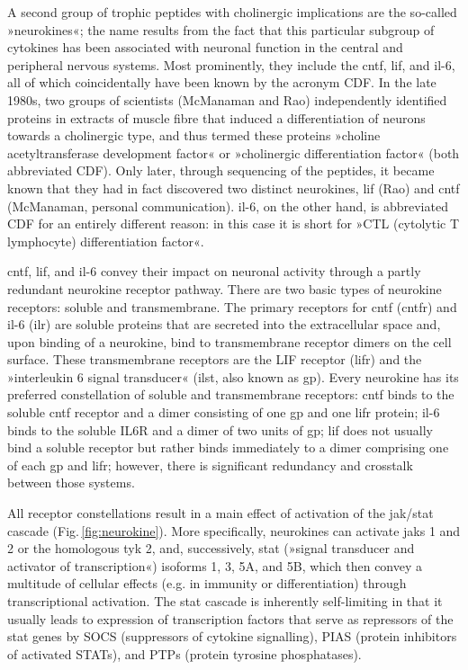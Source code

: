A second group of trophic peptides with cholinergic implications are the so-called »neurokines«; the name results from the fact that this particular subgroup of cytokines has been associated with neuronal function in the central and peripheral nervous systems. Most prominently, they include the \ac{cntf}, \ac{lif}, and \ac{il}-6, all of which coincidentally have been known by the acronym CDF. In the late 1980s, two groups of scientists (McManaman\cite{McManaman1988} and Rao\cite{Rao1992}) independently identified proteins in extracts of muscle fibre that induced a differentiation of neurons towards a cholinergic type, and thus termed these proteins »choline acetyltransferase development factor« or »cholinergic differentiation factor« (both abbreviated CDF). Only later, through sequencing of the peptides, it became known that they had in fact discovered two distinct neurokines, \ac{lif} (Rao) and \ac{cntf} (McManaman, personal communication). \ac{il}-6, on the other hand, is abbreviated CDF for an entirely different reason: in this case it is short for »CTL (cytolytic T lymphocyte) differentiation factor«.

\ac{cntf}, \ac{lif}, and \ac{il}-6 convey their impact on neuronal activity through a partly redundant neurokine receptor pathway.\cite{Berger2014} There are two basic types of neurokine receptors: soluble and transmembrane. The primary receptors for \ac{cntf} (\acs{cntfr}) and \ac{il}-6 (\acs{ilr}) are soluble proteins that are secreted into the extracellular space and, upon binding of a neurokine, bind to transmembrane receptor dimers on the cell surface. These transmembrane receptors are the LIF receptor (\acs{lifr}) and the »interleukin 6 signal transducer« (\acs{ilst}, also known as \acs{gp}). Every neurokine has its preferred constellation of soluble and transmembrane receptors: \ac{cntf} binds to the soluble \ac{cntf} receptor and a dimer consisting of one \ac{gp} and one \ac{lifr} protein; \ac{il}-6 binds to the soluble IL6R and a dimer of two units of \ac{gp}; \ac{lif} does not usually bind a soluble receptor but rather binds immediately to a dimer comprising one of each \ac{gp} and \ac{lifr}; however, there is significant redundancy and crosstalk between those systems.\cite{Rawlings2004,Nathanson2012}

All receptor constellations result in a main effect of activation of the \acs{jak}/\acs{stat} cascade (Fig.\,\ref{fig:neurokine}). More specifically, neurokines can activate \acfp{jak} 1 and 2 or the homologous \ac{tyk} 2, and, successively, \ac{stat} (»signal transducer and activator of transcription«) isoforms 1, 3, 5A, and 5B, which then convey a multitude of cellular effects (e.g. in immunity or differentiation) through transcriptional activation. The \ac{stat} cascade is inherently self-limiting in that it usually leads to expression of transcription factors that serve as repressors of the \ac{stat} genes by SOCS (suppressors of cytokine signalling), PIAS (protein inhibitors of activated STATs), and PTPs (protein tyrosine phosphatases).\cite{Rawlings2004}

